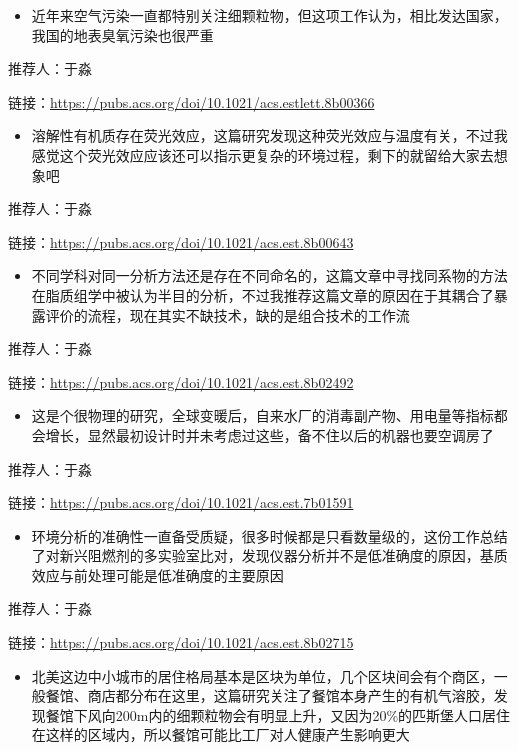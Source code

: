 \documentclass[]{book}
\providecommand{\tightlist}{%
  \setlength{\itemsep}{0pt}\setlength{\parskip}{0pt}}
\begin{document}
\begin{itemize}
\tightlist
\item
  近年来空气污染一直都特别关注细颗粒物，但这项工作认为，相比发达国家，我国的地表臭氧污染也很严重
\end{itemize}

推荐人：于淼

链接：\url{https://pubs.acs.org/doi/10.1021/acs.estlett.8b00366}

\begin{itemize}
\tightlist
\item
  溶解性有机质存在荧光效应，这篇研究发现这种荧光效应与温度有关，不过我感觉这个荧光效应应该还可以指示更复杂的环境过程，剩下的就留给大家去想象吧
\end{itemize}

推荐人：于淼

链接：\url{https://pubs.acs.org/doi/10.1021/acs.est.8b00643}

\begin{itemize}
\tightlist
\item
  不同学科对同一分析方法还是存在不同命名的，这篇文章中寻找同系物的方法在脂质组学中被认为半目的分析，不过我推荐这篇文章的原因在于其耦合了暴露评价的流程，现在其实不缺技术，缺的是组合技术的工作流
\end{itemize}

推荐人：于淼

链接：\url{https://pubs.acs.org/doi/10.1021/acs.est.8b02492}

\begin{itemize}
\tightlist
\item
  这是个很物理的研究，全球变暖后，自来水厂的消毒副产物、用电量等指标都会增长，显然最初设计时并未考虑过这些，备不住以后的机器也要空调房了
\end{itemize}

推荐人：于淼

链接：\url{https://pubs.acs.org/doi/10.1021/acs.est.7b01591}

\begin{itemize}
\tightlist
\item
  环境分析的准确性一直备受质疑，很多时候都是只看数量级的，这份工作总结了对新兴阻燃剂的多实验室比对，发现仪器分析并不是低准确度的原因，基质效应与前处理可能是低准确度的主要原因
\end{itemize}

推荐人：于淼

链接：\url{https://pubs.acs.org/doi/10.1021/acs.est.8b02715}

\begin{itemize}
\tightlist
\item
  北美这边中小城市的居住格局基本是区块为单位，几个区块间会有个商区，一般餐馆、商店都分布在这里，这篇研究关注了餐馆本身产生的有机气溶胶，发现餐馆下风向200m内的细颗粒物会有明显上升，又因为20\%的匹斯堡人口居住在这样的区域内，所以餐馆可能比工厂对人健康产生影响更大
\end{itemize}
\end{document}
